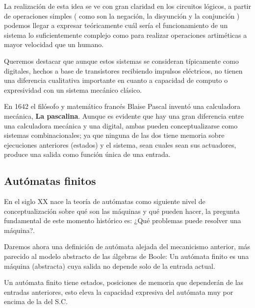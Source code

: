 \vspace{10px}


La realización de esta idea se ve con gran claridad en los circuitos lógicos, a partir de operaciones simples ( como son la negación, la disyunción y la conjunción ) podemos llegar a expresar teóricamente cuál sería el funcionamiento de un sistema lo suficientemente complejo como para realizar operaciones artiméticas a mayor velocidad que un humano.

\vspace{10px}

Queremos destacar que aunque estos sistemas se consideran típicamente como digitales, hechos a base de transistores recibiendo impulsos eléctricos, no tienen una diferencia cualitativa importante en cuanto a capacidad de computo o expresividad con un sistema mecánico clásico.

\vspace{10px}

En 1642 el filósofo y matemático francés Blaise Pascal inventó una calculadora mecánica, \textbf{La pascalina}. Aunque es evidente que hay una gran diferencia entre una calculadora mecánica y una digital, ambas pueden conceptualizarse como sistemas combinacionales; ya que ninguna de las dos tiene memoria sobre ejecuciones anteriores (estados) y el sistema, sean cuales sean sus actuadores, produce una salida como función única de una entrada. 


\subsection{Autómatas finitos}


En el siglo XX nace la teoría de autómatas como siguiente nivel de conceptualización sobre qué son las máquinas y qué pueden hacer, la pregunta fundamental de este momento histórico es: ¿Qué problemas puede resolver una máquina?.

\vspace{10px}

Daremos ahora una definición de autómata alejada del mecanicismo anterior, más parecido al modelo abstracto de las álgebras de Boole: Un autómata finito es una máquina (abstracta) cuya salida no depende solo de la entrada actual.

\vspace{10px}

Un autómata finito tiene estados, posiciones de memoria que dependerán de las entradas anteriores, esto eleva la capacidad expresiva del autómata muy por encima de la del S.C. \\

